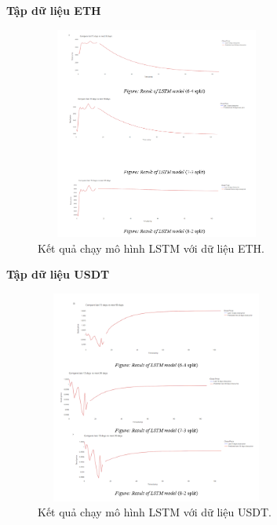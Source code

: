 \documentclass[conference]{IEEEtran}
\begin{document}
\textbf{Tập dữ liệu ETH}
\begin{figure}[H] %
    \centering
    \includegraphics[width=8cm, height=7cm]{Images/LSTM-ETH.png} %
    \caption{Kết quả chạy mô hình LSTM với dữ liệu ETH.}
    \label{fig:arima-model}
\end{figure}

\textbf{Tập dữ liệu USDT}
\begin{figure}[H] %
    \centering
    \includegraphics[width=8cm, height=7cm]{Images/LSTM-USDT.png} %
    \caption{Kết quả chạy mô hình LSTM với dữ liệu USDT.}
    \label{fig:arima-model}
\end{figure}
\end{document}
